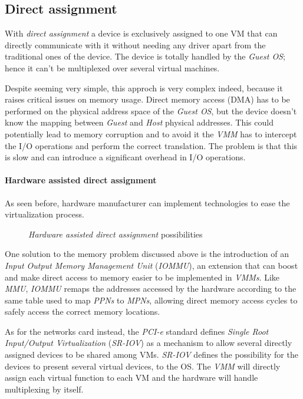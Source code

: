 \subsection{Direct assignment}
With \emph{direct assignment} a device is exclusively assigned to one VM that
can directly communicate with it without needing any driver apart from the
traditional ones of the device. The device is totally handled by the \emph{Guest
OS}; hence it can't be multiplexed over several virtual machines.

Despite seeming very simple, this approch is very complex indeed, because it
raises critical issues on memory usage. Direct memory access (DMA) has to be
performed on the physical address space of the \emph{Guest OS}, but the device
doesn't know the mapping between \emph{Guest} and \emph{Host} physical addresses.
This could potentially lead to memory corruption and to avoid it the \emph{VMM}
has to intercept the I/O operations and perform the correct translation. The
problem is that this is slow and can introduce a significant overhead in I/O
operations.

\paragraph{Hardware assisted direct assignment}
As seen before, hardware manufacturer can implement technologies to ease the
virtualization process.

\begin{figure}[ht!]
    \centering
    \hspace{2cm}
    \caption{\emph{Hardware assisted direct assignment} possibilities}
\end{figure}

\noindent
One solution to the memory problem discussed above
is the introduction of an \emph{Input Output Memory Management Unit}
(\emph{IOMMU}), an extension that can boost and make direct access to memory
easier to be implemented in \emph{VMMs}. Like \emph{MMU}, \emph{IOMMU}
remaps the addresses accessed by the hardware according to the same table used
to map \emph{PPNs} to \emph{MPNs}, allowing direct memory access cycles to
safely access the correct memory locations.

As for the networks card instead, the \emph{PCI-e} standard defines
\emph{Single Root Input/Output Virtualization} (\emph{SR-IOV}) as a mechanism
to allow several directly assigned devices to be shared among VMs. \emph{SR-IOV}
defines the possibility for the devices to present several virtual devices,
 to the OS. The \emph{VMM} will directly assign each
virtual function to each VM and the hardware will handle multiplexing by
itself.

